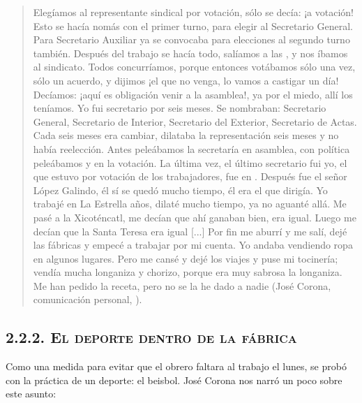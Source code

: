 \documentclass[14pt,letterpaper,twoside]{extbook} %
\begin{document}
\begin{quotation}
\noindent Elegíamos al representante sindical por votación, sólo se decía: ¡a votación! Esto se hacía nomás con el primer turno, para elegir al Secretario General. Para Secretario Auxiliar ya se convocaba para elecciones al segundo turno también. Después del trabajo se hacía todo, salíamos a las , y nos íbamos al sindicato. Todos concurríamos, porque entonces votábamos sólo una vez, sólo un acuerdo, y dijimos ¡el que no venga, lo vamos a castigar un día! Decíamos: ¡aquí es obligación venir a la asamblea!, ya por el miedo, allí los teníamos. Yo fui secretario por seis meses. Se nombraban: Secretario General, Secretario de Interior, Secretario del Exterior, Secretario de Actas. Cada seis meses era cambiar, dilataba la representación seis meses y no había reelección. Antes peleábamos la secretaría en asamblea, con política peleábamos y en la votación. La última vez, el último secretario fui yo, el que estuvo por votación de los trabajadores, fue en . Después fue el señor López Galindo, él sí se quedó mucho tiempo, él era el que dirigía. Yo trabajé en La Estrella  años, dilaté mucho tiempo, ya no aguanté allá. Me pasé a la Xicoténcatl, me decían que ahí ganaban bien, era igual. Luego me decían que la Santa Teresa era igual [...] Por fin me aburrí y me salí, dejé las fábricas y empecé a trabajar por mi cuenta. Yo andaba vendiendo ropa en algunos lugares. Pero me cansé y dejé los viajes y puse mi tocinería; vendía mucha longaniza y chorizo, porque era muy sabrosa la longaniza. Me han pedido la receta, pero no se la he dado a nadie (José Corona, comunicación personal, ).
\end{quotation}

\subsection*{\mdseries\large\textsc{2.2.2. El deporte dentro de la fábrica}}

\noindent Como una medida para evitar que el obrero faltara al trabajo el lunes, se probó con la práctica de un deporte: el beisbol. José Corona nos narró un poco sobre este asunto:
\end{document}
